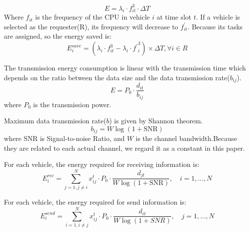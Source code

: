 \documentclass[conference]{IEEEtran}
\begin{document}
\begin{equation}
	E=\lambda_{i} \cdot f_{it}^{3} \cdot \Delta T
	\label{ef}
\end{equation}
Where $f_ {it}$ is the frequency of the CPU in vehicle $i$ at time slot $t$. If a vehicle is selected as the requester(R), its frequency will decrease to $f^ \prime _ {it}$. Because its tasks are assigned, so the energy saved  is:
\begin{equation}
	E_{i}^{save}
	=( \lambda_{i} \cdot f_{it}^{3} -
	\lambda_{i} \cdot{f^{\prime}}_{i}^{3} ) \times \Delta T
	, 
	\forall i \in R
\end{equation}

The transmission energy consumption is linear with the transmission time which depends on the ratio between the data size and the data transmission rate($b_{ij}$). 
\begin{equation}
	E = P_0 \cdot \frac{d_{it}}{b_{ij}}
\end{equation} 
where $P_0$ is the transmission power.

Maximum data transmission rate($b$) is given by Shannon theorem. 
\begin{equation}
	b_{ij} = W\log (1 + \text{SNR})
\end{equation}
where SNR is Signal-to-noise Ratio, and $W$ is the channel bandwidth.Because they are related to each actual channel, we regard it as a constant in this paper.

For each vehicle, the energy required for receiving information is:
\begin{equation}
	E_{i}^{r e c}=\sum_{j =1, j \ne i}^{N} x _{ij}^{t} \cdot P_0 \cdot \frac{d_{jt}}{W\log (1 + \text{SNR})}, 
	\quad  i = 1, \dots ,N
\end{equation}


For each vehicle, the energy required for send information is:
\begin{equation}
	E_{i}^{send}=\sum_{i =1, i \ne j}^{N} x _{ij}^{t} \cdot P_0 \cdot \frac{d_{it}}{W\log (1 + SNR)},
	\quad  j = 1, \dots ,N
\end{equation}    
\end{document}

